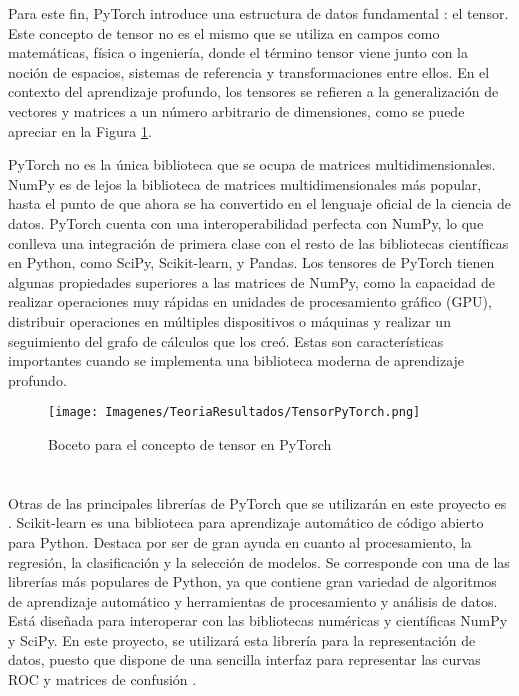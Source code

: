 \documentclass{report}
\begin{document}
 Para este fin, PyTorch introduce una estructura de datos fundamental \cite{DeepLearningPytorchBook}: el tensor. Este concepto de tensor no es el mismo que se utiliza en campos como matemáticas, física o ingeniería, donde el término tensor viene junto con la noción de espacios, sistemas de referencia y transformaciones entre ellos. En el contexto del aprendizaje profundo, los tensores se refieren a la generalización de vectores y matrices a un número arbitrario de dimensiones, como se puede apreciar en la Figura \ref{fig:PyTorchTensor}. 


PyTorch no es la única biblioteca que se ocupa de matrices multidimensionales. NumPy es de lejos la biblioteca de matrices multidimensionales más popular, hasta el punto de que ahora se ha convertido en el lenguaje oficial de la ciencia de datos. PyTorch cuenta con una interoperabilidad perfecta con NumPy, lo que conlleva una integración de primera clase con el resto de las bibliotecas científicas en Python, como SciPy, Scikit-learn, y Pandas.
Los tensores de PyTorch tienen algunas propiedades superiores a las matrices de NumPy, como la capacidad de realizar operaciones muy rápidas en unidades de procesamiento gráfico (GPU), distribuir operaciones en múltiples dispositivos o máquinas y realizar un seguimiento del grafo de cálculos que los creó. Estas son características importantes cuando se implementa una biblioteca moderna de aprendizaje profundo.


\vspace{0.4cm}
\begin{figure}[H]
    \centering
    \texttt{[image: Imagenes/TeoriaResultados/TensorPyTorch.png]}
    \caption{ Boceto para el concepto de tensor en PyTorch \cite{DeepLearningPytorchBook} }
    \label{fig:PyTorchTensor}
\end{figure}
\vspace{0.4cm}



\section{  }

Otras de las principales librerías de PyTorch que se utilizarán en este proyecto es . Scikit-learn es una biblioteca para aprendizaje automático de código abierto para Python. Destaca por ser de gran ayuda en cuanto al procesamiento, la regresión, la clasificación y la selección de modelos. Se corresponde con una de las librerías más populares de Python, ya que contiene gran variedad de algoritmos de aprendizaje automático y herramientas de procesamiento y análisis de datos. Está diseñada para interoperar con las bibliotecas numéricas y científicas NumPy y SciPy. En este proyecto, se utilizará esta librería para la representación de datos, puesto que dispone de una sencilla interfaz para representar las curvas ROC y matrices de confusión \cite{ScikitTokio}.
\end{document}
